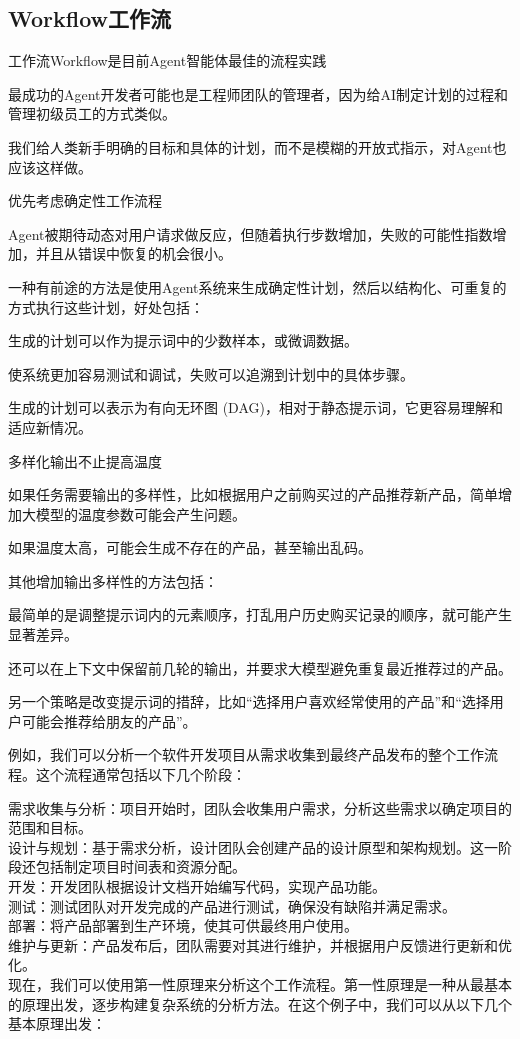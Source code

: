 \documentclass[12pt]{book}
\begin{document}
\subsection{Workflow工作流}
工作流Workflow是目前Agent智能体最佳的流程实践

最成功的Agent开发者可能也是工程师团队的管理者，因为给AI制定计划的过程和管理初级员工的方式类似。

我们给人类新手明确的目标和具体的计划，而不是模糊的开放式指示，对Agent也应该这样做。

优先考虑确定性工作流程

Agent被期待动态对用户请求做反应，但随着执行步数增加，失败的可能性指数增加，并且从错误中恢复的机会很小。

一种有前途的方法是使用Agent系统来生成确定性计划，然后以结构化、可重复的方式执行这些计划，好处包括：

生成的计划可以作为提示词中的少数样本，或微调数据。

使系统更加容易测试和调试，失败可以追溯到计划中的具体步骤。

生成的计划可以表示为有向无环图 (DAG)，相对于静态提示词，它更容易理解和适应新情况。

多样化输出不止提高温度

如果任务需要输出的多样性，比如根据用户之前购买过的产品推荐新产品，简单增加大模型的温度参数可能会产生问题。

如果温度太高，可能会生成不存在的产品，甚至输出乱码。

其他增加输出多样性的方法包括：

最简单的是调整提示词内的元素顺序，打乱用户历史购买记录的顺序，就可能产生显著差异。

还可以在上下文中保留前几轮的输出，并要求大模型避免重复最近推荐过的产品。

另一个策略是改变提示词的措辞，比如“选择用户喜欢经常使用的产品”和“选择用户可能会推荐给朋友的产品”。

例如，我们可以分析一个软件开发项目从需求收集到最终产品发布的整个工作流程。这个流程通常包括以下几个阶段：

需求收集与分析：项目开始时，团队会收集用户需求，分析这些需求以确定项目的范围和目标。\\
设计与规划：基于需求分析，设计团队会创建产品的设计原型和架构规划。这一阶段还包括制定项目时间表和资源分配。\\
开发：开发团队根据设计文档开始编写代码，实现产品功能。\\
测试：测试团队对开发完成的产品进行测试，确保没有缺陷并满足需求。\\
部署：将产品部署到生产环境，使其可供最终用户使用。\\
维护与更新：产品发布后，团队需要对其进行维护，并根据用户反馈进行更新和优化。\\
现在，我们可以使用第一性原理来分析这个工作流程。第一性原理是一种从最基本的原理出发，逐步构建复杂系统的分析方法。在这个例子中，我们可以从以下几个基本原理出发：\\
\end{document}
